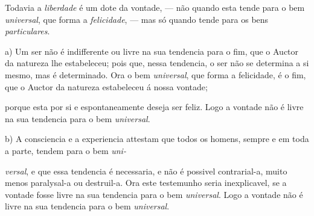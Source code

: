 Todavia a \emph{liberdade} é um dote da vontade, --- não quando esta tende para o bem \emph{universal}, que forma a \emph{felicidade}, --- mas só quando tende para os bens \emph{particulares}.


 

a) Um ser não é indifferente ou livre na sua tendencia para o fim, que o Auctor da natureza lhe estabeleceu; pois que, nessa tendencia, o ser não se determina a si mesmo, mas é determinado. Ora o bem \emph{universal}, que forma a felicidade, é o fim, que o Auctor da natureza estabeleceu á nossa vontade;

porque esta por si e espontaneamente deseja ser feliz. Logo a vontade não é livre na sua tendencia para o bem \emph{universal}.

b) A consciencia e a experiencia attestam que todos os homens, sempre e em toda a parte, tendem para o bem \emph{uni-} 

\emph{versal}, e que essa tendencia é necessaria, e não é possivel contrarial-a, muito menos paralysal-a ou destruil-a. Ora este testemunho seria inexplicavel, se a vontade fosse livre na sua tendencia para o bem \emph{universal}. Logo a vontade não é livre na sua tendencia para o bem \emph{universal}.

